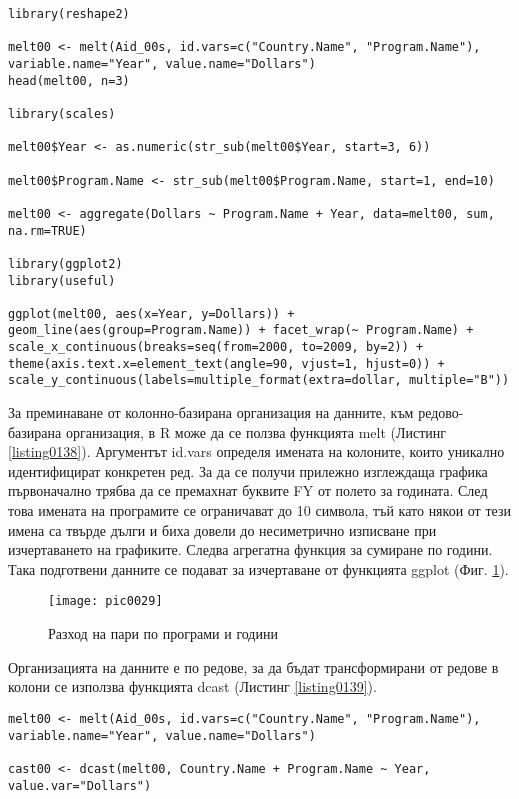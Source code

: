 \begin{lstlisting}[caption=От колони към редове, label=listing0138]
library(reshape2)

melt00 <- melt(Aid_00s, id.vars=c("Country.Name", "Program.Name"), variable.name="Year", value.name="Dollars")
head(melt00, n=3)

library(scales)

melt00$Year <- as.numeric(str_sub(melt00$Year, start=3, 6))

melt00$Program.Name <- str_sub(melt00$Program.Name, start=1, end=10)

melt00 <- aggregate(Dollars ~ Program.Name + Year, data=melt00, sum, na.rm=TRUE)

library(ggplot2)
library(useful)

ggplot(melt00, aes(x=Year, y=Dollars)) + geom_line(aes(group=Program.Name)) + facet_wrap(~ Program.Name) + scale_x_continuous(breaks=seq(from=2000, to=2009, by=2)) + theme(axis.text.x=element_text(angle=90, vjust=1, hjust=0)) + scale_y_continuous(labels=multiple_format(extra=dollar, multiple="B"))
\end{lstlisting}

За преминаване от колонно-базирана организация на данните, към редово-базирана организация, в R може да се ползва функцията melt (Листинг \ref{listing0138}). Аргументът id.vars определя имената на колоните, които уникално идентифицират конкретен ред. За да се получи прилежно изглеждаща графика първоначално трябва да се премахнат буквите FY от полето за годината. След това имената на програмите се ограничават до 10 символа, тъй като някои от тези имена са твърде дълги и биха довели до несиметрично изписване при изчертаването на графиките. Следва агрегатна функция за сумиране по години. Така подготвени данните се подават за изчертаване от функцията ggplot (Фиг. \ref{figure0029}).

\begin{figure}[h!]
  \centering
  \texttt{[image: pic0029]}
  \caption{Разход на пари по програми и години}
\label{figure0029}
\end{figure}
\FloatBarrier

Организацията на  данните е по редове, за да бъдат трансформирани от редове в колони се използва функцията dcast (Листинг \ref{listing0139}).

\begin{lstlisting}[caption=От редове към колони, label=listing0139]
melt00 <- melt(Aid_00s, id.vars=c("Country.Name", "Program.Name"), variable.name="Year", value.name="Dollars")
 
cast00 <- dcast(melt00, Country.Name + Program.Name ~ Year, value.var="Dollars")
\end{lstlisting}

